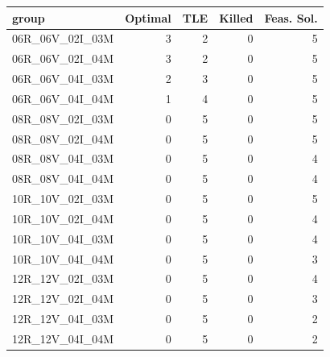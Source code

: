 
\begin{tabular}{lrrrr}
\toprule
group & Optimal & TLE & Killed & Feas. Sol.\\
\midrule
06R\_06V\_02I\_03M & 3 & 2 & 0 & 5\\
06R\_06V\_02I\_04M & 3 & 2 & 0 & 5\\
06R\_06V\_04I\_03M & 2 & 3 & 0 & 5\\
06R\_06V\_04I\_04M & 1 & 4 & 0 & 5\\
08R\_08V\_02I\_03M & 0 & 5 & 0 & 5\\
\addlinespace
08R\_08V\_02I\_04M & 0 & 5 & 0 & 5\\
08R\_08V\_04I\_03M & 0 & 5 & 0 & 4\\
08R\_08V\_04I\_04M & 0 & 5 & 0 & 4\\
10R\_10V\_02I\_03M & 0 & 5 & 0 & 5\\
10R\_10V\_02I\_04M & 0 & 5 & 0 & 4\\
\addlinespace
10R\_10V\_04I\_03M & 0 & 5 & 0 & 4\\
10R\_10V\_04I\_04M & 0 & 5 & 0 & 3\\
12R\_12V\_02I\_03M & 0 & 5 & 0 & 4\\
12R\_12V\_02I\_04M & 0 & 5 & 0 & 3\\
12R\_12V\_04I\_03M & 0 & 5 & 0 & 2\\
\addlinespace
12R\_12V\_04I\_04M & 0 & 5 & 0 & 2\\
\bottomrule
\end{tabular}
